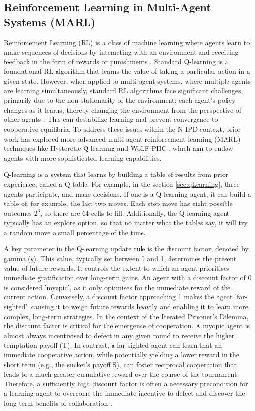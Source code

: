\documentclass[]{llncs} %
\begin{document}
\subsection{Reinforcement Learning in Multi-Agent Systems (MARL)}
Reinforcement Learning (RL) is a class of machine learning where
agents learn to make sequences of decisions by interacting with an
environment and receiving feedback in the form of rewards or
punishments \cite{SuttonBarto1998}.  Standard Q-learning is a
foundational RL algorithm that learns the value of taking a particular
action in a given state. However, when applied to multi-agent
systems, where multiple agents are learning simultaneously, standard
RL algorithms face significant challenges, primarily due to the
non-stationarity of the environment: each agent's policy changes as it
learns, thereby changing the environment from the perspective of other
agents \cite{Busoniu2008}.  This can destabilize learning and prevent
convergence to cooperative equilibria. To address these issues within
the N-IPD context, prior work has explored more advanced multi-agent
reinforcement learning (MARL) techniques like Hysteretic Q-learning
\cite{Matignon} and WoLF-PHC \cite{Bowling},
which aim to endow agents with more sophisticated learning
capabilities. 

Q-learning \cite {Watkins} is a system that learns by building a table
of results from prior experience, called a Q-table.  For example, in
the section \ref {sec:qLearning}, three agents participate, and make
decisions.  If one is a Q-learning agent, it can build a table of, for
example, the last two moves.  Each step move has eight possible
outcomes $2^3$, so there are 64 cells to fill.  Additionally, the
Q-learning agent typically has an explore option, so that no matter
what the tables say, it will try a random move a small percentage of
the time.

A key parameter in the Q-learning update rule is the discount factor, denoted by gamma (γ). This value, typically set between 0 and 1, determines the present value of future rewards. It controls the extent to which an agent prioritises immediate gratification over long-term gains. An agent with a discount factor of 0 is considered 'myopic', as it only optimises for the immediate reward of the current action. Conversely, a discount factor approaching 1 makes the agent 'far-sighted', causing it to weigh future rewards heavily and enabling it to learn more complex, long-term strategies.
In the context of the Iterated Prisoner's Dilemma, the discount factor is critical for the emergence of cooperation. A myopic agent is almost always incentivised to defect in any given round to receive the higher temptation payoff (T). In contrast, a far-sighted agent can learn that an immediate cooperative action, while potentially yielding a lower reward in the short term (e.g., the sucker's payoff S), can foster reciprocal cooperation that leads to a much greater cumulative reward over the course of the tournament. Therefore, a sufficiently high discount factor is often a necessary precondition for a learning agent to overcome the immediate incentive to defect and discover the long-term benefits of collaboration \cite{SuttonBarto2018}.
\end{document}

